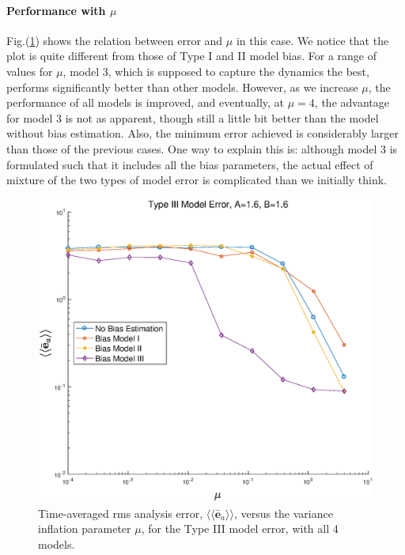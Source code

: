 \documentclass[twocolumn]{article}
\begin{document}
\paragraph{Performance with $\mu$}
Fig.(\ref{AErrVsMuM3.1}) shows the relation between error and $\mu$ in this case. We notice that the plot is quite different from those of Type I and II model bias. For a range of values for $\mu$, model 3, which is supposed to capture the dynamics the best, performs significantly better than other models. However, as we increase $\mu$, the performance of all models is improved, and eventually, at $\mu=4$, the advantage for model 3 is not as apparent, though still a little bit better than the model without bias estimation. Also, the minimum error achieved is considerably larger than those of the previous cases. One way to explain this is: although model 3 is formulated such that it includes all the bias parameters, the actual effect of mixture of the two types of model error is complicated than we initially think.
\begin{figure} 
\centering
\includegraphics[scale=0.3]{Figures/AErrVsMuM3_1}
\caption{Time-averaged rms analysis error, $\langle\langle\bar{\pmb{e}}_a\rangle\rangle$, versus the variance inflation parameter $\mu$, for the Type III model error, with all 4 models.}
\label{AErrVsMuM3.1}
\end{figure}
\end{document}
